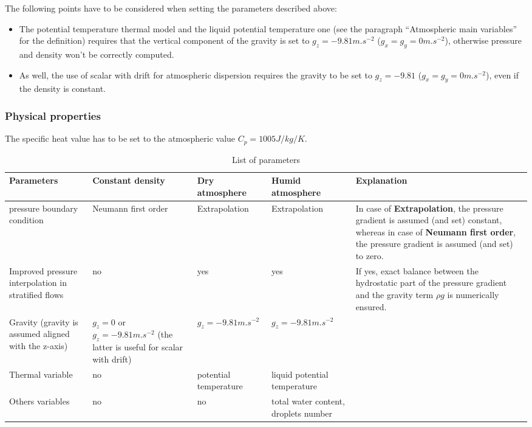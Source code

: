 {{The following points have to be considered when setting the parameters
described above:
\begin{itemize}
\item The potential temperature thermal model and the liquid potential
temperature one (see the paragraph ``Atmospheric main variables'' for the
definition) requires that the vertical component of the gravity is set to
$g_z=-9.81 m.s^{-2}$ ($g_x=g_y=0 m.s^{-2}$),
otherwise pressure and density won't be correctly computed.
\item As well, the use of scalar with drift for atmospheric dispersion requires
the gravity to be set to $g_z=-9.81$ ($g_x=g_y=0 m.s^{-2}$), even if the density
is constant.
\end{itemize}
%
\subsubsection{Physical properties}
%
The specific heat value has to be set to the atmospheric value
$C_{p}=1005 J/kg/K$.
%
\begin{table}[ht]\label{tab:param_list}
\begin{center}
\begin{tabular}{|p{80pt}|p{70pt}|p{70pt}|p{80pt}|p{100pt}|}
\hline
\textbf{Parameters} & \textbf{Constant density} & \textbf{Dry atmosphere} & \textbf{Humid atmosphere} & \textbf{Explanation} \\
\hline
pressure boundary condition & Neumann first order & Extrapolation & Extrapolation &
In case of \textbf{Extrapolation}, the pressure gradient is assumed (and set) constant, whereas in case of \textbf{Neumann first order},
the pressure gradient is assumed (and set) to zero. \\
\hline
Improved pressure interpolation in stratified flows & no & yes & yes & If yes, exact balance between the hydrostatic part of the pressure gradient and the gravity term $\rho g$ is numerically ensured. \\
\hline
Gravity (gravity is assumed aligned with the z-axis) & $g_z=0$ or $g_z=-9.81 m.s^{-2}$ (the latter is useful for scalar with drift) & $g_z=-9.81 m.s^{-2}$ & $g_z=-9.81 m.s^{-2}$ &  \\
\hline
Thermal variable & no & potential temperature & liquid potential temperature &  \\
\hline
Others variables & no & no & total water content, droplets number &  \\
\hline
\end{tabular}\label{tab1}
\caption[List of parameters]{List of parameters}
\end{center}
\end{table}
%
}}
